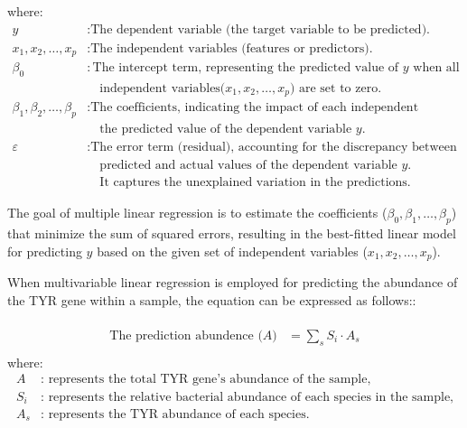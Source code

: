 \documentclass[12pt]{article}
\begin{document}
where:
\begin{align*}
y & : \text{The dependent variable (the target variable to be predicted).} \\
x_1, x_2, \ldots, x_p & : \text{The independent variables (features or predictors).} \\
\beta_0 & : \text{The intercept term, representing the predicted value of } y \text{ when all } \\
& \quad \text{independent variables(\(x_1, x_2, \ldots, x_p\)) are set to zero.} \\
\beta_1, \beta_2, \ldots, \beta_p & : \text{The coefficients, indicating the impact of each independent variable on } \\
& \quad \text{the predicted value of the dependent variable \(y\).} \\
\varepsilon & : \text{The error term (residual), accounting for the discrepancy between the} \\
& \quad \text{predicted and actual values of the dependent variable \(y\). } \\
& \quad \text{It captures the unexplained variation in the predictions.}
\end{align*}

The goal of multiple linear regression is to estimate the coefficients (\(\beta_0, \beta_1, \ldots, \beta_p\)) that minimize the sum of squared errors, resulting in the best-fitted linear model for predicting \(y\) based on the given set of independent variables (\(x_1, x_2, \ldots, x_p\)).

When multivariable linear regression is employed for predicting the abundance of the TYR gene within a sample, the equation can be expressed as follows::\\\\
\begin{align*}
   \text{The prediction abundence (} A \text{)}&= \sum_{s} S_i \cdot A_s \\
\end{align*}
where:
\begin{align*}
    A & : \text{ represents the total TYR gene's abundance of the sample,} \\
    S_i & : \text{ represents the relative bacterial abundance of each species in the sample,} \\
    A_s & : \text{ represents the TYR abundance of each species.}
\end{align*}
\end{document}
